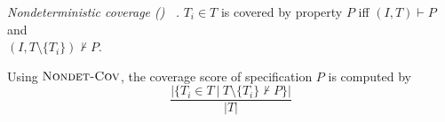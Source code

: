 \begin{definition} {\emph{Nondeterministic coverage (\nondetcov) ~\cite{chockler2010coverage}.} }
\label{def:non-det}
$T_i \in T$ is covered by property $P$ iff
$(I, T) \vdash P$ and\\ $(I, T \setminus \{T_i\}) \nvdash P$.
\end{definition}

Using  $\text{\sc Nondet-Cov}$, the coverage score of specification $P$ is computed by
\[
   \frac{ | \{T_i \in T~|~ T \setminus \{T_i\} \nvdash P\} |}{|T|}
\]



